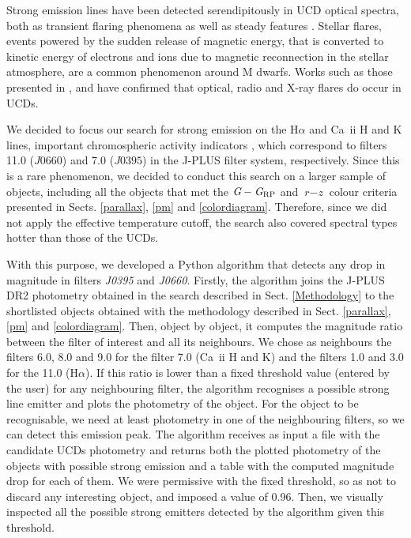 Strong emission lines have been detected serendipitously in UCD optical spectra, both as transient flaring  phenomena  \citep{Liebert1999,Liebert2003,Martin2001,Schmidt2007} as well as steady  features  \citep{Schneider1991,Mould1994,Martin1999,Burgasser2011}. Stellar flares, events powered by the sudden release of magnetic energy, that is converted to kinetic energy of electrons and ions due to magnetic reconnection in the stellar atmosphere, are a common phenomenon around M dwarfs. Works such as those presented in \citet{flare_xray}, \citet{Berger2010} and \citet{arecibo} have confirmed that optical, radio and X-ray flares do occur in UCDs.

We decided to focus our search for strong emission on the H$\alpha$ and Ca~{\sc ii} H and K lines, important chromospheric activity indicators \citep{cincunegui}, which correspond to filters 11.0 ($J0660$) and 7.0 ($J0395$) in the J-PLUS filter system, respectively. Since this is a rare phenomenon, we decided to conduct this search on a larger sample of objects, including all the objects that met the $\textit{G} - \textit{G}_{\rm RP}$ and $\textit{r}-\textit{z}$ colour criteria presented in Sects. \ref{parallax}, \ref{pm} and \ref{colordiagram}. Therefore, since we did not apply the effective temperature cutoff, the search also covered spectral types hotter than those of the UCDs.

With this purpose, we developed a Python algorithm that detects any drop in magnitude in filters \textit{J0395} and \textit{J0660}. Firstly, the algorithm joins the J-PLUS DR2 photometry obtained in the search described in Sect. \ref{Methodology} to the shortlisted objects obtained with the methodology described in Sect. \ref{parallax}, \ref{pm} and \ref{colordiagram}. Then, object by object, it computes the magnitude ratio between the filter of interest and all its neighbours. We chose as neighbours the filters 6.0, 8.0 and 9.0 for the filter 7.0 (Ca~{\sc ii} H and K) and the filters 1.0 and 3.0 for the 11.0 (H$\alpha$). If this ratio is lower than a fixed threshold value (entered by the user) for any neighbouring filter, the algorithm recognises a  possible strong line emitter and plots the photometry of the object. For the object to be recognisable, we need at least photometry in one of the neighbouring filters, so we can detect this emission peak. The algorithm receives as input a file with the candidate UCDs photometry and returns both the plotted photometry of the objects with possible strong emission and a table with the computed magnitude drop for each of them. We were permissive with the fixed threshold, so as not to discard any interesting object, and imposed a value of 0.96. Then, we visually inspected all the possible strong emitters detected by the algorithm given this threshold.


